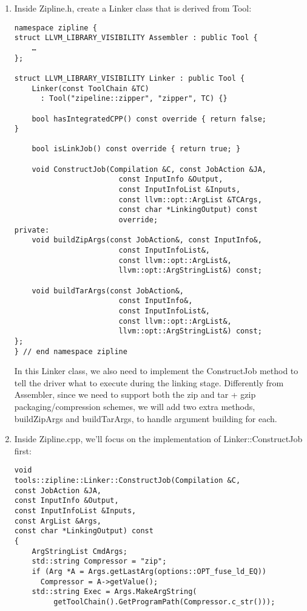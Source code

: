 \begin{enumerate}
\item Inside Zipline.h, create a Linker class that is derived from Tool:

\begin{lstlisting}[style=styleCXX]
namespace zipline {
struct LLVM_LIBRARY_VISIBILITY Assembler : public Tool {
	…
};

struct LLVM_LIBRARY_VISIBILITY Linker : public Tool {
	Linker(const ToolChain &TC)
	  : Tool("zipeline::zipper", "zipper", TC) {}
	  
	bool hasIntegratedCPP() const override { return false;
}

	bool isLinkJob() const override { return true; }
	
	void ConstructJob(Compilation &C, const JobAction &JA,
						const InputInfo &Output,
						const InputInfoList &Inputs,
						const llvm::opt::ArgList &TCArgs,
						const char *LinkingOutput) const
						override;
private:
	void buildZipArgs(const JobAction&, const InputInfo&,
						const InputInfoList&,
						const llvm::opt::ArgList&,
						llvm::opt::ArgStringList&) const;
						
	void buildTarArgs(const JobAction&,
						const InputInfo&,
						const InputInfoList&,
						const llvm::opt::ArgList&,
						llvm::opt::ArgStringList&) const;
};
} // end namespace zipline
\end{lstlisting}

In this Linker class, we also need to implement the ConstructJob method to tell the driver what to execute during the linking stage. Differently from Assembler, since we need to support both the zip and tar + gzip packaging/compression schemes, we will add two extra methods, buildZipArgs and buildTarArgs, to handle argument building for each.

\item Inside Zipline.cpp, we'll focus on the implementation of Linker::ConstructJob first:

\begin{lstlisting}[style=styleCXX]
void
tools::zipline::Linker::ConstructJob(Compilation &C,
const JobAction &JA,
const InputInfo &Output,
const InputInfoList &Inputs,
const ArgList &Args,
const char *LinkingOutput) const
{
	ArgStringList CmdArgs;
	std::string Compressor = "zip";
	if (Arg *A = Args.getLastArg(options::OPT_fuse_ld_EQ))
	  Compressor = A->getValue();
	std::string Exec = Args.MakeArgString(
	     getToolChain().GetProgramPath(Compressor.c_str()));
	

\end{lstlisting}
\end{enumerate}
